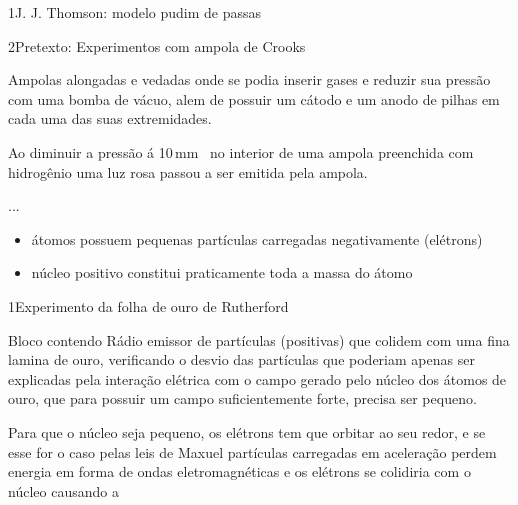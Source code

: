 \begin{sectionBox}1{J. J. Thomson: modelo pudim de passas}

    \begin{sectionBox}2{Pretexto: Experimentos com ampola de Crooks}

        Ampolas alongadas e vedadas onde se podia inserir gases e reduzir sua pressão com uma bomba de vácuo, alem de possuir um cátodo e um anodo de pilhas em cada uma das suas extremidades.

        Ao diminuir a pressão á 10\,\unit{\milli\meter{}} no interior de uma ampola preenchida com hidrogênio uma luz rosa passou a ser emitida pela ampola.

        ...


    \end{sectionBox}

    \begin{itemize}
        \item átomos possuem pequenas partículas carregadas negativamente (elétrons)
        \item núcleo positivo constitui praticamente toda a massa do átomo
    \end{itemize}

\end{sectionBox}

\begin{sectionBox}1{Experimento da folha de ouro de Rutherford}

    Bloco contendo Rádio emissor de partículas \alpha (positivas) que colidem com uma fina lamina de ouro, verificando o desvio das partículas \alpha que poderiam apenas ser explicadas pela interação elétrica com o campo gerado pelo núcleo dos átomos de ouro, que para possuir um campo suficientemente forte, precisa ser pequeno.

    Para que o núcleo seja pequeno, os elétrons tem que orbitar ao seu redor, e se esse for o caso pelas leis de Maxuel partículas carregadas em aceleração perdem energia em forma de ondas eletromagnéticas e os elétrons se colidiria com o núcleo causando a %

\end{sectionBox}


